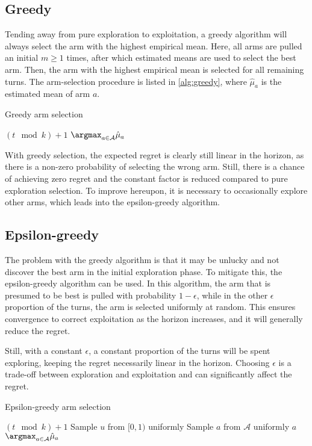 \subsection{Greedy}
Tending away from pure exploration to exploitation, a greedy algorithm will always select the arm with the highest empirical mean.
Here, all arms are pulled an initial $m \geq 1$ times, after which estimated means are used to select the best arm.
Then, the arm with the highest empirical mean is selected for all remaining turns.
The arm-selection procedure is listed in \cref{alg:greedy}, where $\hat{\mu}_a$ is the estimated mean of arm $a$.
\begin{algorithm}
    \caption{Greedy arm selection}
    \label{alg:greedy}
    \begin{algorithmic}
        \State \Return $(t \mod k) + 1$
        \Else
        \State \Return $\argmax_{a \in \mathcal{A}} \hat{\mu}_a$
        \EndIf
    \end{algorithmic}
\end{algorithm}

With greedy selection, the expected regret is clearly still linear in the horizon, as there is a non-zero probability of selecting the wrong arm.
Still, there is a chance of achieving zero regret and the constant factor is reduced compared to pure exploration selection.
To improve hereupon, it is necessary to occasionally explore other arms, which leads into the epsilon-greedy algorithm.

\subsection{Epsilon-greedy}
The problem with the greedy algorithm is that it may be unlucky and not discover the best arm in the initial exploration phase.
To mitigate this, the epsilon-greedy algorithm can be used.
In this algorithm, the arm that is presumed to be best is pulled with probability $1-\epsilon$, while in the other $\epsilon$ proportion of the turns, the arm is selected uniformly at random.
This ensures convergence to correct exploitation as the horizon increases, and it will generally reduce the regret.

Still, with a constant $\epsilon$, a constant proportion of the turns will be spent exploring, keeping the regret necessarily linear in the horizon.
Choosing $\epsilon$ is a trade-off between exploration and exploitation and can significantly affect the regret.

\begin{algorithm}
    \caption{Epsilon-greedy arm selection}
    \label{alg:eps_greedy}
    \begin{algorithmic}
        \State \Return $(t \mod k) + 1$
        \Else
        \State Sample $u$ from $[0,1)$ uniformly
        \State Sample $a$ from $\mathcal{A}$ uniformly
        \State \Return $a$
        \Else
        \State \Return $\argmax_{a \in \mathcal{A}}\hat{\mu}_a$
        \EndIf
        \EndIf
    \end{algorithmic}
\end{algorithm}



